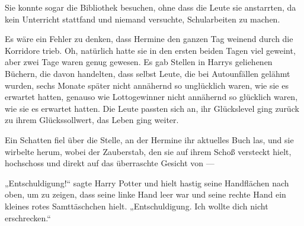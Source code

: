 Sie konnte sogar die Bibliothek besuchen, ohne dass die Leute sie anstarrten, da kein Unterricht stattfand und niemand versuchte, Schularbeiten zu machen.

Es wäre ein Fehler zu denken, dass Hermine den ganzen Tag weinend durch die Korridore trieb. Oh, natürlich hatte sie in den ersten beiden Tagen viel geweint, aber zwei Tage waren genug gewesen. Es gab Stellen in Harrys geliehenen Büchern, die davon handelten, dass selbst Leute, die bei Autounfällen gelähmt wurden, sechs Monate später nicht annähernd so unglücklich waren, wie sie es erwartet hatten, genauso wie Lottogewinner nicht annähernd so glücklich waren, wie sie es erwartet hatten. Die Leute passten sich an, ihr Glückslevel ging zurück zu ihrem Glückssollwert, das Leben ging weiter.

Ein Schatten fiel über die Stelle, an der Hermine ihr aktuelles Buch las, und sie wirbelte herum, wobei der Zauberstab, den sie auf ihrem Schoß versteckt hielt, hochschoss und direkt auf das überraschte Gesicht von —

„Entschuldigung!“ sagte Harry Potter und hielt hastig seine Handflächen nach oben, um zu zeigen, dass seine linke Hand leer war und seine rechte Hand ein kleines rotes Samttäschchen hielt.
„Entschuldigung. Ich wollte dich nicht erschrecken.“

